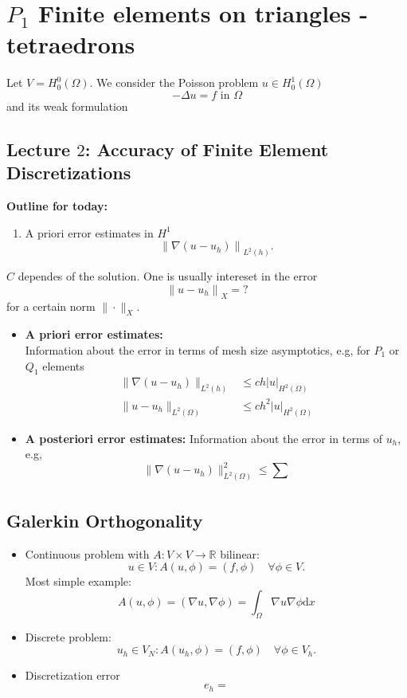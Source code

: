 \documentclass[openany,a4paper,11pt]{memoir}
\theoremstyle{definition}
\begin{document}
\chapter{$P_1$ Finite elements on triangles - tetraedrons}
Let $V=H^0_0\left(\Omega\right)$. We consider the Poisson problem $u\in H^1_0\left(\Omega\right)$ \[-\Delta u=f\text{ in }\Omega \] and its weak formulation %
\section{Lecture $2$: Accuracy of Finite Element Discretizations}

\textbf{Outline for today:}

\begin{enumerate}
\item A priori error estimates in $H^{1}$ \[ {\|\nabla(u-u_h)\|}_{L^{2}(h)}. \]
\end{enumerate}

$C$ dependes of the solution. One is usually intereset in the error \[ {\|u-u_{h}\|}_{X}=? \] for a certain norm $\|\cdot\|_{X}$.
\begin{itemize}
\item \textbf{A priori error estimates:}\\ Information about the error in terms of mesh size asymptotics, e.g, for $P_{1}$ or $Q_{1}$ elements
  \begin{align*}
    \|\nabla\left(u-u_{h}\right)\|_{L^{2}(h)}&\le ch{|u|}_{H^{2}(\Omega)} \\
    \|u-u_{h}\|_{L^{2}(\Omega)}&\le ch^{2}{|u|}_{H^2(\Omega)}
  \end{align*}
\item \textbf{A posteriori error estimates:} Information about the error in terms of $u_{h}$, e.g, \[ \|\nabla(u-u_{h})\|^{2}_{L^{2}(\Omega)}\le \sum_{}\]
\end{itemize}

\section{Galerkin Orthogonality}

\begin{itemize}
\item Continuous problem with $A\colon V\times V\rightarrow\mathbb{R}$ bilinear: \[ u\in V\colon A\left(u,\phi\right)=\left(f,\phi\right)\quad\forall\phi\in V. \] Most simple example: \[ A\left(u,\phi\right)=\left(\nabla u,\nabla\phi\right)=\int_{\Omega}\nabla u\nabla\phi\mathrm{d}x \]
\item Discrete problem: \[ u_{h}\in V_{N}\colon A\left(u_h,\phi\right)=\left(f,\phi\right)\quad\forall\phi\in V_{h}. \]
  
\item Discretization error \[ e_{h}= \]
\end{itemize}
\end{document}
